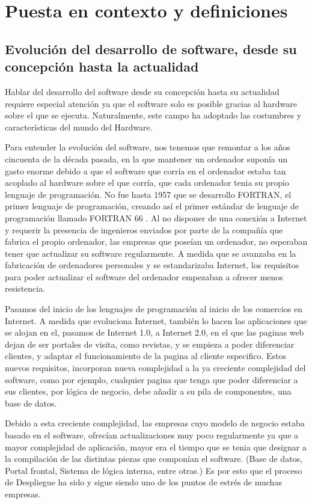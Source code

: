 \documentclass[12pt]{report} %
\begin{document}
\chapter{Puesta en contexto y definiciones}

\section{Evolución del desarrollo de software, desde su concepción hasta la
actualidad}

Hablar del desarrollo del software desde su concepción hasta su actualidad
requiere especial atención ya que el software solo es posible gracias al
hardware sobre el que se ejecuta.  Naturalmente, este campo ha adoptado las
costumbres y características del mundo del Hardware.

Para entender la evolución del software, nos tenemos que remontar a los años
cincuenta de la década pasada, en la que mantener un ordenador suponía un gasto
enorme debido a que el software que corría en el ordenador estaba tan acoplado
al hardware sobre el que corría, que cada ordenador tenia su propio lenguaje de
programación.  No fue hasta 1957 que se desarrollo FORTRAN, el primer lenguaje
de programación, creando así el primer estándar de lenguaje de programación
llamado FORTRAN 66 \nocite{FORTRAN1966}.  Al no disponer de una conexión a
Internet y requerir la presencia de ingenieros enviados por parte de la compañía
que fabrica el propio ordenador, las empresas que poseían un ordenador, no
esperaban tener que actualizar su software regularmente.  A medida que se
avanzaba en la fabricación de ordenadores personales y se estandarizaba
Internet, los requisitos para poder actualizar el software del ordenador
empezaban a ofrecer menos resistencia.

Pasamos del inicio de los lenguajes de programación al inicio de los comercios
en Internet.  A medida que evoluciona Internet, también lo hacen las
aplicaciones que se alojan en el, pasamos de Internet 1.0, a  Internet 2.0, en
el que las paginas web dejan de ser portales de visita, como revistas, y se
empieza a poder diferenciar clientes, y adaptar el funcionamiento de la pagina
al cliente especifico.  Estos nuevos requisitos, incorporan nueva complejidad a
la ya creciente complejidad del software, como por ejemplo, cualquier pagina que
tenga que poder diferenciar a sus clientes, por lógica de negocio, debe añadir a
su pila de componentes, una base de datos.

Debido a esta creciente complejidad, las empresas cuyo modelo de negocio estaba
basado en el software, ofrecían actualizaciones muy poco regularmente ya que a
mayor complejidad de aplicación, mayor era el tiempo que se tenia que designar a
la compilación de las distintas piezas que componían el software. (Base de
datos, Portal frontal, Sistema de lógica interna, entre otras.) Es por esto que
el proceso de Despliegue ha sido y sigue siendo uno de los puntos de estrés de
muchas empresas.
\end{document}
